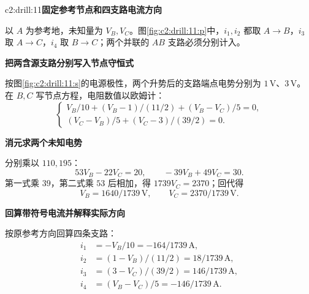 \begin{drillsolution}{c2:drill:11}\textbf{固定参考节点和四支路电流方向}\par\nobreak
以 $A$ 为参考地，未知量为 $V_B,V_C$。图\ref{fig:c2:drill:11:p}中，$i_1,i_2$ 都取 $A\to B$，$i_3$ 取 $A\to C$，$i_4$ 取 $B\to C$；两个并联的 $AB$ 支路必须分别计入。


\par\medskip{}\noindent\textbf{把两含源支路分别写入节点守恒式}\par\nobreak
按图\ref{fig:c2:drill:11:s}的电源极性，两个升势后的支路端点电势分别为 $1\,\mathrm V$、$3\,\mathrm V$。在 $B,C$ 写节点方程，电阻数值以欧姆计：
\[
 \begin{cases}
 V_B/10+(V_B-1)/(11/2)+(V_B-V_C)/5=0,\\
 (V_C-V_B)/5+(V_C-3)/(39/2)=0.
 \end{cases}
\]


\par\medskip{}\noindent\textbf{消元求两个未知电势}\par\nobreak
分别乘以 $110,195$：
\[
 53V_B-22V_C=20,\qquad -39V_B+49V_C=30.
\]
第一式乘 $39$，第二式乘 $53$ 后相加，得 $1739V_C=2370$；回代得
\[
 \boxed{V_B=1640/1739\,\mathrm V},\qquad
 \boxed{V_C=2370/1739\,\mathrm V}.
\]


\par\medskip{}\noindent\textbf{回算带符号电流并解释实际方向}\par\nobreak
按原参考方向回算四条支路：
\begin{align*}
 i_1&=-V_B/10=-164/1739\,\mathrm A,\\
 i_2&=(1-V_B)/(11/2)=18/1739\,\mathrm A,\\
 i_3&=(3-V_C)/(39/2)=146/1739\,\mathrm A,\\
 i_4&=(V_B-V_C)/5=-146/1739\,\mathrm A.
\end{align*}



\end{drillsolution}

